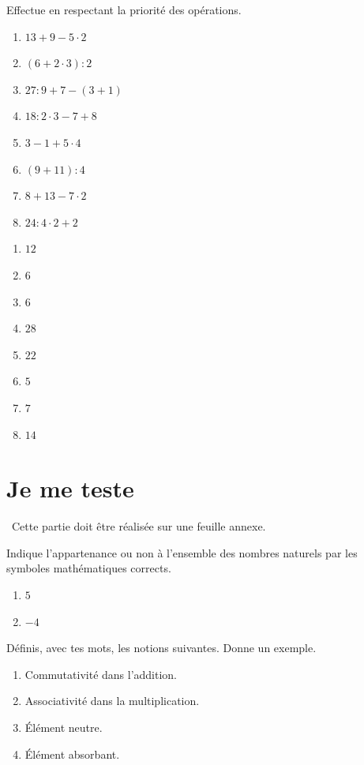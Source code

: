 \documentclass[../../syllabus_1.tex]{subfiles}
\begin{document}
\begin{exercise}
    Effectue en respectant la priorité des opérations.
    \begin{enumerate}[cols=2]
        \item \(13 + 9 - 5 \cdot 2\)
        \item \((6 + 2 \cdot 3) :2\)
        \item \(27 : 9 + 7 - (3 + 1)\)
        \item \(18 : 2 \cdot 3 - 7 + 8\)
        \item $3 - 1 + 5 \cdot 4$
        \item $\left(9+11\right) : 4$
        \item $8 + 13 - 7 \cdot 2$
        \item $24 : 4 \cdot 2 + 2$
    \end{enumerate}
\end{exercise}
\begin{solution}
    \begin{enumerate}
        \item $12$
        \item $6$
        \item $6$
        \item $28$
        \item $22$
        \item $5$
        \item $7$
        \item $14$
    \end{enumerate}
\end{solution}

\newpage
\section{Je me teste}
~Cette partie doit être réalisée sur une feuille annexe.
\setcounter{exercise}{0}

\begin{exercise}
    Indique l'appartenance ou non à l'ensemble des nombres naturels par les symboles mathématiques corrects.
    \begin{enumerate}[cols=2]
        \item \(5 \)
        \item \(-4 \)
    \end{enumerate}
\end{exercise}

\begin{exercise}
    Définis, avec tes mots, les notions suivantes. Donne un exemple.
    \begin{enumerate}
        \item Commutativité dans l'addition.
        \item Associativité dans la multiplication.
        \item Élément neutre.
        \item Élément absorbant.
    \end{enumerate}
\end{exercise}
\end{document}
